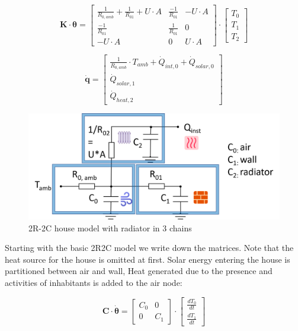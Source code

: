 \begin{equation}
	\mathbf{K} \cdot \boldsymbol{\theta} =
	\begin{bmatrix}
		\frac{1}{R_{0, amb}} + \frac{1}{R_{01}} + U \cdot A & \frac{-1}{R_{01}} & -U \cdot A  \\
		\frac{-1}{R_{01}} &  \frac{1}{R_{01}}  & 0  \\
		-U \cdot A & 0 & U \cdot A 
	\end{bmatrix}
	\cdot
	\begin{bmatrix}
		T_{0} \\
		T_{1} \\
		T_{2}
	\end{bmatrix}
\end{equation}

\begin{equation}
	\mathbf{\dot{q}} =
	\begin{bmatrix}
		\frac{1}{R_{0, amb}} \cdot T_{amb} + \dot{Q}_{int, 0} + \dot{Q}_{solar, 0} \\
		\dot{Q}_{solar, 1} \\
		\dot{Q}_{heat, 2}
	\end{bmatrix}
\end{equation}


\begin{figure}[H]
	\centering
	\includegraphics[width=0.7\columnwidth]{Figures/2R2C_radiator_chains.png}
	\caption[Short title]{2R-2C house model with radiator in 3 chains}
	\label{fig:2R2Cradiator_chains}
\end{figure} 

Starting with the basic 2R2C model we write down the matrices. Note that the heat source for the house is omitted at first. Solar energy entering the house is partitioned between air and wall, Heat generated due to the presence and activities of inhabitants is added to the air node:

\begin{equation}
	\mathbf{C} \cdot \boldsymbol{\dot{\theta}} =
	\begin{bmatrix}
		C_{0} & 0 \\
		0 &  C_{1}
	\end{bmatrix}
	\cdot
	\begin{bmatrix}
		\frac{dT_{0}}{dt} \\
		\frac{dT_{1}}{dt}
	\end{bmatrix}
\end{equation}

